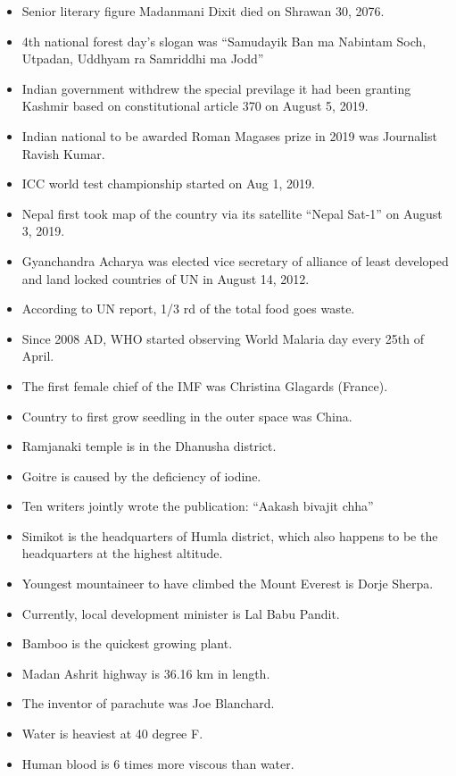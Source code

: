 \documentclass[
]{book}
\begin{document}
\begin{itemize}
\item
  Senior literary figure Madanmani Dixit died on Shrawan 30, 2076.
\item
  4th national forest day's slogan was ``Samudayik Ban ma Nabintam Soch, Utpadan, Uddhyam ra Samriddhi ma Jodd''
\item
  Indian government withdrew the special previlage it had been granting Kashmir based on constitutional article 370 on August 5, 2019.
\item
  Indian national to be awarded Roman Magases prize in 2019 was Journalist Ravish Kumar.
\item
  ICC world test championship started on Aug 1, 2019.
\item
  Nepal first took map of the country via its satellite ``Nepal Sat-1'' on August 3, 2019.
\item
  Gyanchandra Acharya was elected vice secretary of alliance of least developed and land locked countries of UN in August 14, 2012.
\item
  According to UN report, 1/3 rd of the total food goes waste.
\item
  Since 2008 AD, WHO started observing World Malaria day every 25th of April.
\item
  The first female chief of the IMF was Christina Glagards (France).
\item
  Country to first grow seedling in the outer space was China.
\item
  Ramjanaki temple is in the Dhanusha district.
\item
  Goitre is caused by the deficiency of iodine.
\item
  Ten writers jointly wrote the publication: ``Aakash bivajit chha''
\item
  Simikot is the headquarters of Humla district, which also happens to be the headquarters at the highest altitude.
\item
  Youngest mountaineer to have climbed the Mount Everest is Dorje Sherpa.
\item
  Currently, local development minister is Lal Babu Pandit.
\item
  Bamboo is the quickest growing plant.
\item
  Madan Ashrit highway is 36.16 km in length.
\item
  The inventor of parachute was Joe Blanchard.
\item
  Water is heaviest at 40 degree F.
\item
  Human blood is 6 times more viscous than water.

\end{itemize}
\end{document}
